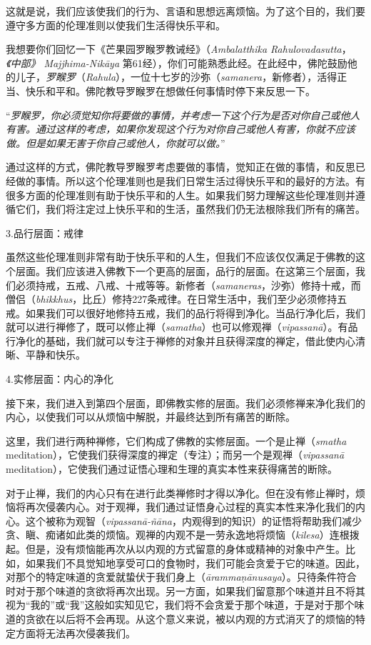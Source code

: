 \1这就是说，我们应该使我们的行为、言语和思想远离烦恼。为了这个目的，我们要遵守多方面的伦理准则以使我们生活得快乐平和。

我想要你们回忆一下《芒果园罗睺罗教诫经》（{\it Ambalatthika Rahulovadasutta}，{\it 《中部》 Majjhima-Nik\=aya} 第61经），你们可能熟悉此经。在此经中，佛陀鼓励他的儿子，{\it 罗睺罗}（{\it Rahula}），一位十七岁的沙弥（{\it samanera}，新修者），活得正当、快乐和平和。佛陀教导罗睺罗在想做任何事情时停下来反思一下。

“{\it 罗睺罗，你必须觉知你将要做的事情，并考虑一下这个行为是否对你自己或他人有害。通过这样的考虑，如果你发现这个行为对你自己或他人有害，你就不应该做。但是如果无害于你自己或他人，你就可以做。}”

通过这样的方式，佛陀教导罗睺罗考虑要做的事情，觉知正在做的事情，和反思已经做的事情。所以这个伦理准则也是我们日常生活过得快乐平和的最好的方法。有很多方面的伦理准则有助于快乐平和的人生。如果我们努力理解这些伦理准则并遵循它们，我们将注定过上快乐平和的生活，虽然我们仍无法根除我们所有的痛苦。

\sssubsectnon 3.品行层面：戒律

虽然这些伦理准则非常有助于快乐平和的人生，但我们不应该仅仅满足于佛教的这个层面。我们应该进入佛教下一个更高的层面，品行的层面。在这第三个层面，我们必须持戒，五戒、八戒、十戒等等。新修者（{\it samaneras}，沙弥）修持十戒，\1而僧侣（{\it bhikkhus}，比丘）修持227条戒律。在日常生活中，我们至少必须修持五戒。如果我们可以很好地修持五戒，我们的品行将得到净化。当品行净化后，我们就可以进行禅修了，既可以修止禅（{\it samatha}）也可以修观禅（{\it vipassan\=a}）。有品行净化的基础，我们就可以专注于禅修的对象并且获得深度的禅定，借此使内心清晰、平静和快乐。

\sssubsectnon 4.实修层面：内心的净化

接下来，我们进入到第四个层面，即佛教实修的层面。我们必须修禅来净化我们的内心，以使我们可以从烦恼中解脱，并最终达到所有痛苦的断除。

这里，我们进行两种禅修，它们构成了佛教的实修层面。一个是止禅（{\it smatha} meditation），它使我们获得深度的禅定（专注）；而另一个是观禅（{\it vipassan\=a} meditation），它使我们通过证悟心理和生理的真实本性来获得痛苦的断除。

对于止禅，我们的内心只有在进行此类禅修时才得以净化。但在没有修止禅时，烦恼将再次侵袭内心。对于观禅，我们通过证悟身心过程的真实本性来净化我们的内心。这个被称为观智（{\it vipassan\=a-\~n\=ana}，内观得到的知识）的证悟将帮助我们减少贪、瞋、痴诸如此类的烦恼。观禅的内观不是一劳永逸地将烦恼（{\it kilesa}）连根拨起。但是，没有烦恼能再次从以内观的方式留意的身体或精神的对象中产生。\1比如，如果我们不具觉知地享受可口的食物时，我们可能会贪爱于它的味道。因此，对那个的特定味道的贪爱就蛰伏于我们身上（{\it \=aramma\d n\=anusaya}）。只待条件符合时对于那个味道的贪欲将再次出现。另一方面，如果我们留意那个味道并且不将其视为“我的”或“我”这般如实知见它，我们将不会贪爱于那个味道，于是对于那个味道的贪欲在以后将不会再现。从这个意义来说，被以内观的方式消灭了的烦恼的特定方面将无法再次侵袭我们。

